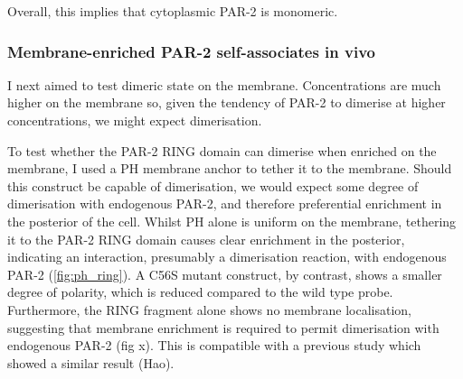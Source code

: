 \documentclass[12pt]{"article"}
\begin{document}
Overall, this implies that cytoplasmic PAR-2 is monomeric.\\

\subsubsection{Membrane-enriched PAR-2 self-associates in vivo}

I next aimed to test dimeric state on the membrane. Concentrations are much higher on the membrane so, given the tendency of PAR-2 to dimerise at higher concentrations, we might expect dimerisation.  

To test whether the PAR-2 RING domain can dimerise when enriched on the membrane, I used a PH membrane anchor to tether it to the membrane. Should this construct be capable of dimerisation, we would expect some degree of dimerisation with endogenous PAR-2, and therefore preferential enrichment in the posterior of the cell. Whilst PH alone is uniform on the membrane, tethering it to the PAR-2 RING domain causes clear enrichment in the posterior, indicating an interaction, presumably a dimerisation reaction, with endogenous PAR-2 (\cref{fig:ph_ring}). A C56S mutant construct, by contrast, shows a smaller degree of polarity, which is reduced compared to the wild type probe. Furthermore, the RING fragment alone shows no membrane localisation, suggesting that membrane enrichment is required to permit dimerisation with endogenous PAR-2 (fig x). This is compatible with a previous study which showed a similar result (Hao). \\
\end{document}
